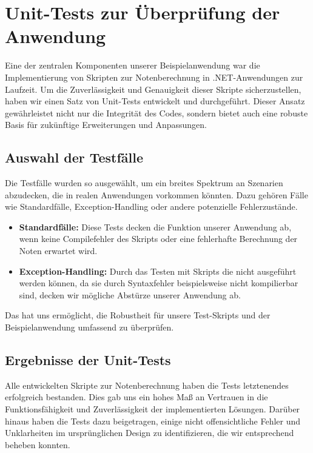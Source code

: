 \newpage
\section{Unit-Tests zur Überprüfung der Anwendung}

Eine der zentralen Komponenten unserer Beispielanwendung war die Implementierung von 
Skripten zur Notenberechnung in .NET-Anwendungen zur Laufzeit. Um die Zuverlässigkeit und 
Genauigkeit dieser Skripte sicherzustellen, haben wir einen Satz von Unit-Tests entwickelt 
und durchgeführt. Dieser Ansatz gewährleistet nicht nur die Integrität des Codes, 
sondern bietet auch eine robuste Basis für zukünftige Erweiterungen und Anpassungen.

\subsection*{Auswahl der Testfälle}
Die Testfälle wurden so ausgewählt, um ein breites Spektrum an Szenarien abzudecken, 
die in realen Anwendungen vorkommen könnten. Dazu gehören Fälle wie Standardfälle, Exception-Handling
oder andere potenzielle Fehlerzustände. \\

\begin{itemize}
    \item \textbf{Standardfälle:} Diese Tests decken die Funktion unserer Anwendung ab, wenn keine 
    Compilefehler des Skripts oder eine fehlerhafte Berechnung der Noten erwartet wird.
    \item  \textbf{Exception-Handling:} Durch das Testen mit Skripts die nicht ausgeführt werden 
    können, da sie durch Syntaxfehler beispielsweise nicht kompilierbar sind, decken wir 
    mögliche Abstürze unserer Anwendung ab.
\end{itemize}

Das hat uns ermöglicht, die Robustheit für unsere Test-Skripts  
und der Beispielanwendung umfassend zu überprüfen.

\newpage

\subsection*{Ergebnisse der Unit-Tests}
Alle entwickelten Skripte zur Notenberechnung haben die Tests letztenendes erfolgreich bestanden. 
Dies gab uns ein hohes Maß an Vertrauen in die Funktionsfähigkeit und Zuverlässigkeit der 
implementierten Lösungen. Darüber hinaus haben die Tests dazu beigetragen, einige nicht 
offensichtliche Fehler und Unklarheiten im ursprünglichen Design zu identifizieren, 
die wir entsprechend beheben konnten.\\


